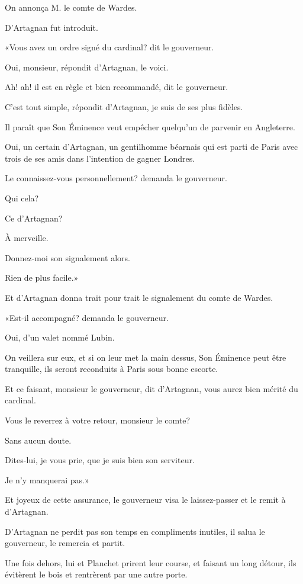On annonça M. le comte de Wardes. 

D'Artagnan fut introduit. 

«Vous avez un ordre signé du cardinal? dit le gouverneur. 

\speak  Oui, monsieur, répondit d'Artagnan, le voici. 

\speak  Ah! ah! il est en règle et bien recommandé, dit le gouverneur. 

\speak  C'est tout simple, répondit d'Artagnan, je suis de ses plus fidèles. 

\speak  Il paraît que Son Éminence veut empêcher quelqu'un de parvenir en Angleterre. 

\speak  Oui, un certain d'Artagnan, un gentilhomme béarnais qui est parti de Paris avec trois de ses amis dans l'intention de gagner Londres. 

\speak  Le connaissez-vous personnellement? demanda le gouverneur. 

\speak  Qui cela? 

\speak  Ce d'Artagnan? 

\speak  À merveille. 

\speak  Donnez-moi son signalement alors. 

\speak  Rien de plus facile.» 

Et d'Artagnan donna trait pour trait le signalement du comte de Wardes. 

«Est-il accompagné? demanda le gouverneur. 

\speak  Oui, d'un valet nommé Lubin. 

\speak  On veillera sur eux, et si on leur met la main dessus, Son Éminence peut être tranquille, ils seront reconduits à Paris sous bonne escorte. 

\speak  Et ce faisant, monsieur le gouverneur, dit d'Artagnan, vous aurez bien mérité du cardinal. 

\speak  Vous le reverrez à votre retour, monsieur le comte? 

\speak  Sans aucun doute. 

\speak  Dites-lui, je vous prie, que je suis bien son serviteur. 

\speak  Je n'y manquerai pas.» 

Et joyeux de cette assurance, le gouverneur visa le laissez-passer et le remit à d'Artagnan. 

D'Artagnan ne perdit pas son temps en compliments inutiles, il salua le gouverneur, le remercia et partit. 

Une fois dehors, lui et Planchet prirent leur course, et faisant un long détour, ils évitèrent le bois et rentrèrent par une autre porte. 

